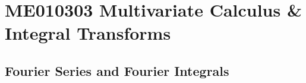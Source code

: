\part{ME010303 Multivariate Calculus \& Integral Transforms}
\chapter{Fourier Series and Fourier Integrals}
